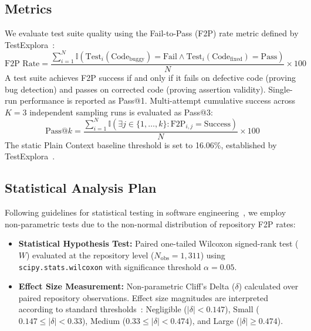 \subsection{Metrics}
\label{subsec:metrics}
We evaluate test suite quality using the Fail-to-Pass (F2P) rate metric defined by TestExplora~\cite{testexplora}:
\begin{equation}
\text{F2P Rate} = \frac{\sum_{i=1}^{N} \mathbb{I}(\text{Test}_i(\text{Code}_{\text{buggy}}) = \text{Fail} \land \text{Test}_i(\text{Code}_{\text{fixed}}) = \text{Pass})}{N} \times 100
\end{equation}
A test suite achieves F2P success if and only if it fails on defective code (proving bug detection) and passes on corrected code (proving assertion validity). Single-run performance is reported as Pass@1. Multi-attempt cumulative success across $K=3$ independent sampling runs is evaluated as Pass@3:
\begin{equation}
\text{Pass@}k = \frac{\sum_{i=1}^{N} \mathbb{I}\left( \exists j \in \{1,\dots,k\}: \text{F2P}_{i,j} = \text{Success} \right)}{N} \times 100
\end{equation}
The static Plain Context baseline threshold is set to 16.06\%, established by TestExplora~\cite{testexplora}.

\subsection{Statistical Analysis Plan}
\label{subsec:stat}
Following guidelines for statistical testing in software engineering~\cite{arcuri2011practical}, we employ non-parametric tests due to the non-normal distribution of repository F2P rates:
\begin{itemize}
    \item \textbf{Statistical Hypothesis Test:} Paired one-tailed Wilcoxon signed-rank test ($W$) evaluated at the repository level ($N_{\text{obs}} = 1,311$) using \texttt{scipy.stats.wilcoxon} with significance threshold $\alpha = 0.05$.
    \item \textbf{Effect Size Measurement:} Non-parametric Cliff's Delta ($\delta$) calculated over paired repository observations. Effect size magnitudes are interpreted according to standard thresholds~\cite{arcuri2011practical, cliffs}: Negligible ($|\delta| < 0.147$), Small ($0.147 \le |\delta| < 0.33$), Medium ($0.33 \le |\delta| < 0.474$), and Large ($|\delta| \ge 0.474$).
\end{itemize}
